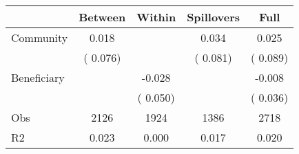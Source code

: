 
\begin{tabular}{l*{4}{c}}\hline&\multicolumn{1}{c}{Between}&\multicolumn{1}{c}{Within}&\multicolumn{1}{c}{Spillovers}&\multicolumn{1}{c}{Full}\\ \hline
 Community             &              0.018      &                                               &        0.034 &         0.025                            \\ 
                               &        (       0.076)           &                                       &       (       0.081)     &      (       0.089)                                           \\ 
 Beneficiary   &                                               &       -0.028    &                                &            -0.008                            \\ 
                               &                                               & (       0.050)                  &                                        &      (       0.036)                                           \\ 
\hline                                                                                                                                                                                                                                            
 Obs                   &               2126               &       1924                       &       1386                &              2718                                               \\ 
 R2                    &                      0.023              &              0.000                      &              0.017               &                     0.020                                              \\ 
\hline \end{tabular}                                                                                                                                                                                                              